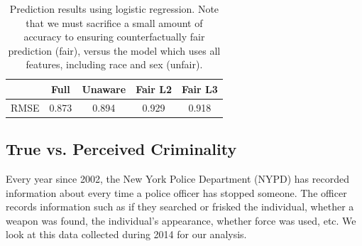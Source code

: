 
\begin{table}
\centering
\caption{Prediction results using logistic regression. Note that we must sacrifice a small amount of accuracy to ensuring counterfactually fair prediction (fair), versus the model which uses all features, including race and sex (unfair).}\label{table.pred_law}
\begin{tabular}{ccccc} 
\hline
 &  {\bf Full} & {\bf Unaware} & {\bf Fair L2} & {\bf Fair L3} \\
\hline
RMSE & 0.873 & 0.894 & 0.929 & 0.918 \\
\hline
\end{tabular}
\end{table}



\subsection{True vs. Perceived Criminality}
Every year since 2002, the New York Police Department (NYPD) has recorded information about every time a police officer has stopped someone. The officer records information such as if they searched or frisked the individual, whether a weapon was found, the individual's appearance, whether force was used, etc. We look at this data collected during 2014 for our analysis.

